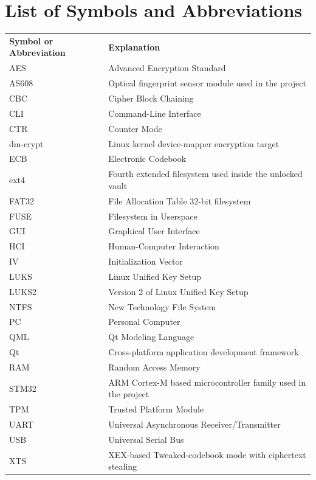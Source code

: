 \chapter*{List of Symbols and Abbreviations}

\small
\begin{tabularx}{0.9\textwidth}{@{}p{}@{\hspace{0.4em}:\hspace{0.4em}}X@{}}
    \textbf{Symbol or} \newline \textbf{Abbreviation} & \textbf{Explanation}\\
    
    
    AES & Advanced Encryption Standard\\
    AS608 & Optical fingerprint sensor module used in the project\\
    CBC & Cipher Block Chaining\\
    CLI & Command-Line Interface\\
    CTR & Counter Mode\\
    dm-crypt & Linux kernel device-mapper encryption target\\
    ECB & Electronic Codebook\\
    ext4 & Fourth extended filesystem used inside the unlocked vault\\
    FAT32 & File Allocation Table 32-bit filesystem\\
    FUSE & Filesystem in Userspace\\
    GUI & Graphical User Interface\\
    HCI & Human-Computer Interaction\\
    IV & Initialization Vector\\
    LUKS & Linux Unified Key Setup\\
    LUKS2 & Version 2 of Linux Unified Key Setup\\
    NTFS & New Technology File System\\
    PC & Personal Computer\\
    QML & Qt Modeling Language\\
    Qt & Cross-platform application development framework\\
    RAM & Random Access Memory\\
    STM32 & ARM Cortex-M based microcontroller family used in the project\\
    TPM & Trusted Platform Module\\
    UART & Universal Asynchronous Receiver/Transmitter\\
    USB & Universal Serial Bus\\
    XTS & XEX-based Tweaked-codebook mode with ciphertext stealing\\
    
\end{tabularx}
\normalsize

\clearpage
